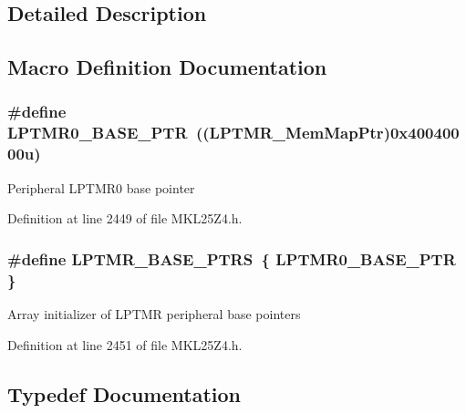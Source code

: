 \subsection{Detailed Description}


\subsection{Macro Definition Documentation}
\subsubsection[{\texorpdfstring{L\+P\+T\+M\+R0\+\_\+\+B\+A\+S\+E\+\_\+\+P\+TR}{LPTMR0_BASE_PTR}}]{\setlength{\rightskip}{0pt plus 5cm}\#define L\+P\+T\+M\+R0\+\_\+\+B\+A\+S\+E\+\_\+\+P\+TR~(({\bf L\+P\+T\+M\+R\+\_\+\+Mem\+Map\+Ptr})0x40040000u)}\hypertarget{group___l_p_t_m_r___peripheral_ga90a9194151ad11b422bcab162e797eda}{}\label{group___l_p_t_m_r___peripheral_ga90a9194151ad11b422bcab162e797eda}
Peripheral L\+P\+T\+M\+R0 base pointer 

Definition at line 2449 of file M\+K\+L25\+Z4.\+h.

\subsubsection[{\texorpdfstring{L\+P\+T\+M\+R\+\_\+\+B\+A\+S\+E\+\_\+\+P\+T\+RS}{LPTMR_BASE_PTRS}}]{\setlength{\rightskip}{0pt plus 5cm}\#define L\+P\+T\+M\+R\+\_\+\+B\+A\+S\+E\+\_\+\+P\+T\+RS~\{ {\bf L\+P\+T\+M\+R0\+\_\+\+B\+A\+S\+E\+\_\+\+P\+TR} \}}\hypertarget{group___l_p_t_m_r___peripheral_gac92660dedc63be48d689d43efc9f2c82}{}\label{group___l_p_t_m_r___peripheral_gac92660dedc63be48d689d43efc9f2c82}
Array initializer of L\+P\+T\+MR peripheral base pointers 

Definition at line 2451 of file M\+K\+L25\+Z4.\+h.



\subsection{Typedef Documentation}
